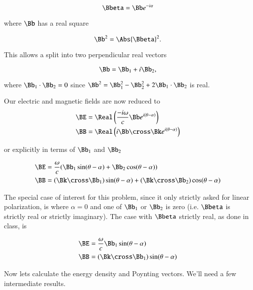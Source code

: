 \begin{equation}\label{eqn:relElectroDynProblemSet4:130}
\Bbeta = \Bb e^{-i\alpha}
\end{equation}

where $\Bb$ has a real square

\begin{equation}\label{eqn:relElectroDynProblemSet4:150}
\Bb^2 = \Abs{\Bbeta}^2.
\end{equation}

This allows a split into two perpendicular real vectors

\begin{equation}\label{eqn:relElectroDynProblemSet4:170}
\Bb = \Bb_1 + i \Bb_2,
\end{equation}

where $\Bb_1 \cdot \Bb_2 = 0$ since $\Bb^2 = \Bb_1^2 - \Bb_2^2 + 2 \Bb_1 \cdot \Bb_2$ is real.

Our electric and magnetic fields are now reduced to
\begin{align}\label{eqn:relElectroDynProblemSet4:190}
\BE &= \Real \left( \frac{-i\omega}{c} \Bb e^{i(\theta - \alpha)} \right) \\
\BB &= \Real \left( i \Bb \cross \Bk e^{i(\theta - \alpha)} \right) 
\end{align}

or explicitly in terms of $\Bb_1$ and $\Bb_2$ 

\begin{align}\label{eqn:relElectroDynProblemSet4:210}
\BE &= \frac{\omega}{c} ( \Bb_1 \sin(\theta-\alpha) + \Bb_2 \cos(\theta-\alpha)) \\
\BB &= ( \Bk \cross \Bb_1 ) \sin(\theta-\alpha) + (\Bk \cross \Bb_2) \cos(\theta-\alpha) 
\end{align}

The special case of interest for this problem, since it only strictly asked for linear polarization, is where $\alpha = 0$ and one of $\Bb_1$ or $\Bb_2$ is zero (i.e. $\Bbeta$ is strictly real or strictly imaginary).  The case with $\Bbeta$ strictly real, as done in class, is

\begin{align}\label{eqn:relElectroDynProblemSet4:230}
\BE &= \frac{\omega}{c} \Bb_1 \sin(\theta-\alpha) \\
\BB &= ( \Bk \cross \Bb_1 ) \sin(\theta-\alpha) 
\end{align}

Now lets calculate the energy density and Poynting vectors.  We'll need a few intermediate results.

